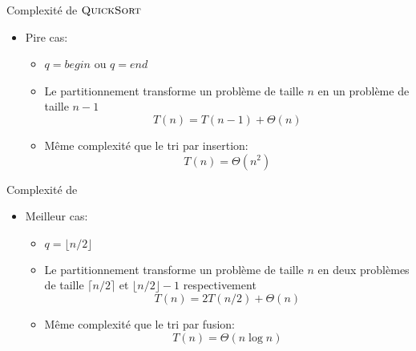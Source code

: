 \begin{frame}{Complexité de $\textnormal{\scshape QuickSort}$}

\begin{center}
\end{center}

\begin{itemize}
\item Pire cas:
\begin{itemize}
\item $q=begin$ ou $q=end$
\item Le partitionnement transforme un problème de taille $n$ en un problème de taille $n-1$
$$T(n)=T(n-1)+\Theta(n)$$
\medskip
\item Même complexité que le tri par insertion:
$$T(n)=\Theta(n^2)$$
\end{itemize}
\end{itemize}
\end{frame}

\begin{frame}{Complexité de }

\begin{center}
\end{center}

\begin{itemize}
\item Meilleur cas:
\begin{itemize}
\item $q=\lfloor n/2 \rfloor$
\item Le partitionnement transforme un problème de taille $n$ en deux
  problèmes de taille $\lceil n/2\rceil$ et $\lfloor n/2 \rfloor-1$ respectivement
$$T(n)=2 T(n/2)+\Theta(n)$$
\medskip
\item Même complexité que le tri par fusion:
$$T(n)=\Theta(n\log n)$$
\end{itemize}
\end{itemize}
\end{frame}

